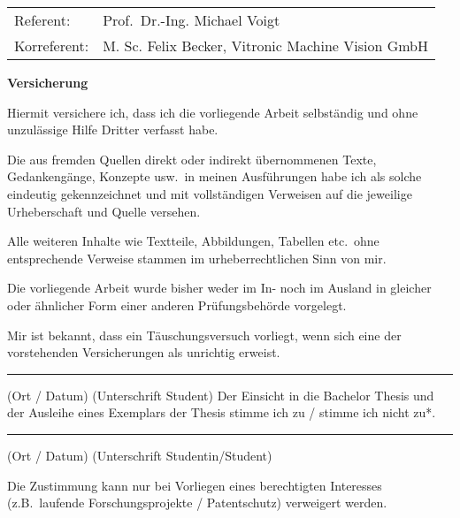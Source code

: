 \vfill
\begin{flushleft}
\begin{tabular}{ll}
    Referent:	 &  Prof.\ Dr.-Ing. Michael Voigt \\ [0.5ex]
    Korreferent:	 &  M. Sc. Felix Becker, Vitronic Machine Vision GmbH
\end{tabular}
\end{flushleft}
\newpage
\thispagestyle{empty}
\rule[0ex]{0ex}{0ex} 	%
\newpage
\thispagestyle{empty} 
%
{\bf Versicherung}
\par
Hiermit versichere ich, dass ich die vorliegende Arbeit selbst\"andig und ohne unzul\"assige Hilfe Dritter verfasst 
habe.
\par
Die aus fremden Quellen direkt oder indirekt \"ubernommenen Texte, Gedankeng\"ange, Konzepte usw.\ in meinen 
Ausf\"uhrungen habe ich als solche eindeutig gekennzeichnet und mit vollst\"andigen Verweisen auf die jeweilige 
Urheberschaft und Quelle versehen.
\par
Alle weiteren Inhalte wie Textteile, Abbildungen, Tabellen etc.\ ohne entsprechende Verweise stammen im 
urheberrechtlichen Sinn von mir.
\par
Die vorliegende Arbeit wurde bisher weder im In- noch im Ausland in gleicher oder \"ahnlicher Form einer anderen 
Pr\"ufungsbeh\"orde vorgelegt.
\par
Mir ist bekannt, dass ein T\"auschungsversuch vorliegt, wenn sich eine der vorstehenden Versicherungen als 
unrichtig erweist.
\par
\vspace{25mm}
\rule[0ex]{\textwidth}{0.4pt}
(Ort / Datum)\hspace{30ex}	(Unterschrift Student)
\newpage
\thispagestyle{empty} 
%
Der Einsicht in die Bachelor Thesis  und der Ausleihe eines Exemplars der Thesis stimme ich zu / stimme ich nicht zu*.
\par\vspace{5mm}
\rule[0ex]{\textwidth}{0.4pt}
(Ort / Datum)\hspace{30ex}	(Unterschrift Studentin/Student)
\par\vspace{5mm}
Die Zustimmung kann nur bei Vorliegen eines berechtigten Interesses (z.B.\ laufende Forschungsprojekte / Patentschutz) 
verweigert werden. 
